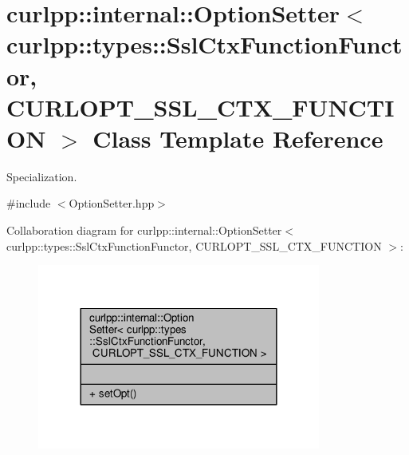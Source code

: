 \hypertarget{classcurlpp_1_1internal_1_1OptionSetter_3_01curlpp_1_1types_1_1SslCtxFunctionFunctor_00_01CURLOPT__SSL__CTX__FUNCTION_01_4}{\section{curlpp\-:\-:internal\-:\-:Option\-Setter$<$ curlpp\-:\-:types\-:\-:Ssl\-Ctx\-Function\-Functor, C\-U\-R\-L\-O\-P\-T\-\_\-\-S\-S\-L\-\_\-\-C\-T\-X\-\_\-\-F\-U\-N\-C\-T\-I\-O\-N $>$ Class Template Reference}
\label{classcurlpp_1_1internal_1_1OptionSetter_3_01curlpp_1_1types_1_1SslCtxFunctionFunctor_00_01CURLOPT__SSL__CTX__FUNCTION_01_4}
}


Specialization.  




{\ttfamily \#include $<$Option\-Setter.\-hpp$>$}



Collaboration diagram for curlpp\-:\-:internal\-:\-:Option\-Setter$<$ curlpp\-:\-:types\-:\-:Ssl\-Ctx\-Function\-Functor, C\-U\-R\-L\-O\-P\-T\-\_\-\-S\-S\-L\-\_\-\-C\-T\-X\-\_\-\-F\-U\-N\-C\-T\-I\-O\-N $>$\-:\nopagebreak
\begin{figure}[H]
\begin{center}
\leavevmode
\includegraphics[width=264pt]{classcurlpp_1_1internal_1_1OptionSetter_3_01curlpp_1_1types_1_1SslCtxFunctionFunctor_00_01CURLOPe98bfd850c0baf60e8fbb9fe7dad920c}
\end{center}
\end{figure}
